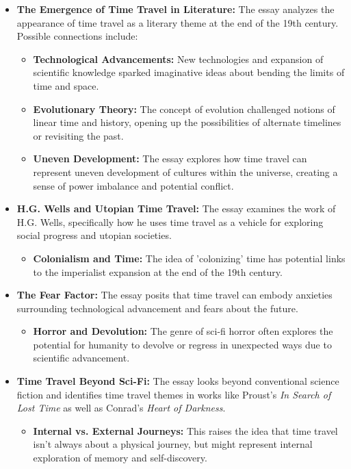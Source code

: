 \documentclass[11pt,fleqn]{book} %
\begin{document}
\begin{itemize}
\item \textbf{The Emergence of Time Travel in Literature:} The essay analyzes the appearance of time travel as a literary theme at the end of the 19th century. Possible connections include:
    \begin{itemize}
        \item \textbf{Technological Advancements:} New technologies and expansion of scientific knowledge sparked imaginative ideas about bending the limits of time and space.
        \item \textbf{Evolutionary Theory:} The concept of evolution challenged notions of linear time and history, opening up the possibilities of alternate timelines or revisiting the past.
        \item \textbf{Uneven Development:} The essay explores how time travel can represent uneven development of cultures within the universe, creating a sense of power imbalance and potential conflict. 
    \end{itemize}

\item \textbf{H.G. Wells and Utopian Time Travel:}  The essay examines the work of H.G. Wells, specifically how he uses time travel as a vehicle for exploring social progress and utopian societies. 
    \begin{itemize}
        \item  \textbf{Colonialism and Time:} The idea of 'colonizing' time has potential links to the imperialist expansion at the end of the 19th century.
    \end{itemize}

\item \textbf{The Fear Factor:} The essay posits that time travel can embody anxieties surrounding technological advancement and fears about the future.
    \begin{itemize}
        \item \textbf{Horror and Devolution:}  The genre of sci-fi horror often explores the potential for humanity to devolve or regress in unexpected ways due to scientific advancement. 
    \end{itemize}

\item \textbf{Time Travel Beyond Sci-Fi:} The essay looks beyond conventional science fiction and identifies time travel themes in works like Proust's \textit{In Search of Lost Time} as well as Conrad's \textit{Heart of Darkness}. 
    \begin{itemize}
        \item \textbf{Internal vs. External Journeys:} This raises the idea that time travel isn't always about a physical journey, but might represent internal exploration of memory and self-discovery.
    \end{itemize}


\end{itemize}
\end{document}

